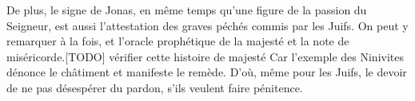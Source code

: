 De plus, le signe de Jonas,
	en même temps qu’une figure de la passion du Seigneur,
	est aussi l’attestation des graves péchés commis par les Juifs.
On peut y remarquer à la fois,
	et l’oracle prophétique de la majesté et la note de miséricorde.[TODO] vérifier cette histoire de majesté
Car l’exemple des Ninivites dénonce le châtiment et manifeste le remède.
D’où, même pour les Juifs,
	le devoir de ne pas désespérer du pardon, s’ils veulent faire pénitence.
